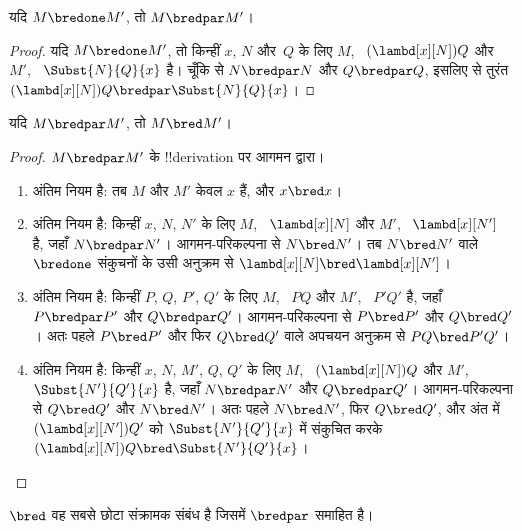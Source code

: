 \documentclass[../../../include/open-logic-section]{subfiles}
\begin{document}


\begin{lem}
  यदि $M \bredone M'$, तो $M \bredpar M'$।
\end{lem}
\begin{proof} यदि $M \bredone M'$, तो किन्हीं $x$, $N$ और~$Q$ के लिए $M$,
    ~$(\lambd[x][N])Q$ और $M'$, ~$\Subst{N}{Q}{x}$ है। चूँकि
     से $N \bredpar N$ और $Q \bredpar Q$, इसलिए
     से तुरंत
    $(\lambd[x][N])Q \bredpar \Subst{N}{Q}{x}$।
\end{proof}

\begin{lem}
  यदि $M \bredpar M'$, तो $M \bred M'$।
\end{lem}

\begin{proof} $M \bredpar M'$ के !!{derivation} पर आगमन द्वारा।
  \begin{enumerate}
  \item अंतिम नियम  है: तब $M$ और $M'$ केवल
    $x$ हैं, और $x \bred x$।
  \item अंतिम नियम  है: किन्हीं $x$, $N$, $N'$
    के लिए $M$, ~$\lambd[x][N]$ और $M'$, ~$\lambd[x][N']$ है, जहाँ $N
    \bredpar N'$। आगमन-परिकल्पना से $N \bred N'$। तब $N \bred N'$ वाले
    $\bredone$ संकुचनों के उसी अनुक्रम से $\lambd[x][N] \bred
    \lambd[x][N']$।
  \item अंतिम नियम  है: किन्हीं $P$, $Q$, $P'$,
    $Q'$ के लिए $M$, ~$PQ$ और $M'$, ~$P'Q'$ है, जहाँ $P \bredpar P'$ और
    $Q \bredpar Q'$। आगमन-परिकल्पना से $P \bred P'$ और $Q \bred Q'$।
    अतः पहले $P \bred P'$ और फिर $Q \bred Q'$ वाले अपचयन अनुक्रम से $PQ
    \bred P'Q'$।
  \item अंतिम नियम  है: किन्हीं $x$, $N$, $M'$,
    $Q$, $Q'$ के लिए $M$, ~$(\lambd[x][N])Q$ और $M'$,
    ~$\Subst{N'}{Q'}{x}$ है, जहाँ $N \bredpar N'$ और $Q \bredpar Q'$।
    आगमन-परिकल्पना से $Q \bred Q'$ और $N \bred N'$। अतः पहले $N \bred
    N'$, फिर $Q \bred Q'$, और अंत में $(\lambd[x][N'])Q'$ को
    $\Subst{N'}{Q'}{x}$ में संकुचित करके $(\lambd[x][N])Q \bred
    \Subst{N'}{Q'}{x}$।
  \end{enumerate}
\end{proof}

\begin{lem}
  $\bred$ वह सबसे छोटा संक्रामक संबंध है जिसमें $\bredpar$ समाहित है।
\end{lem}
\end{document}

